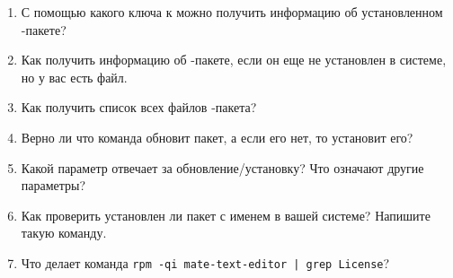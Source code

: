 \begin{enumerate}
	\item С помощью какого ключа к  можно получить информацию об установленном -пакете?
	\item Как получить информацию об -пакете, если он еще не установлен в системе, но у вас есть файл.
	\item Как получить список всех файлов -пакета?
	\item Верно ли что команда  обновит пакет, а если его нет, то установит его?
	\item	Какой параметр отвечает за обновление/установку? Что означают другие параметры?
	\item Как проверить установлен ли пакет с именем  в вашей системе? Напишите такую команду.
	\item Что делает команда \verb!rpm -qi mate-text-editor | grep License!?
\end{enumerate}
